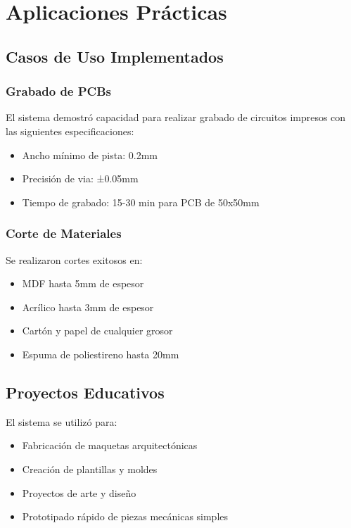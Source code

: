 \documentclass[12pt]{article}
\begin{document}
\section{Aplicaciones Prácticas}

\subsection{Casos de Uso Implementados}

\subsubsection{Grabado de PCBs}

El sistema demostró capacidad para realizar grabado de circuitos impresos con las siguientes especificaciones:
\begin{itemize}
    \item Ancho mínimo de pista: 0.2mm
    \item Precisión de via: ±0.05mm
    \item Tiempo de grabado: 15-30 min para PCB de 50x50mm
\end{itemize}

\subsubsection{Corte de Materiales}

Se realizaron cortes exitosos en:
\begin{itemize}
    \item MDF hasta 5mm de espesor
    \item Acrílico hasta 3mm de espesor
    \item Cartón y papel de cualquier grosor
    \item Espuma de poliestireno hasta 20mm
\end{itemize}

\subsection{Proyectos Educativos}

El sistema se utilizó para:
\begin{itemize}
    \item Fabricación de maquetas arquitectónicas
    \item Creación de plantillas y moldes
    \item Proyectos de arte y diseño
    \item Prototipado rápido de piezas mecánicas simples
\end{itemize}
\end{document}
